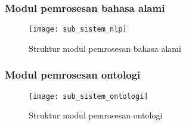 \subsubsection{Modul pemrosesan bahasa alami}

\begin{figure}[tb]
    \centering
    \texttt{[image: sub\_sistem\_nlp]}
    \caption{Struktur modul pemrosesan bahasa alami} 
    \label{fig:sub_sistem_nlp}
\end{figure}

\subsubsection{Modul pemrosesan ontologi}

\begin{figure}[tb]
    \centering
    \texttt{[image: sub\_sistem\_ontologi]}
    \caption{Struktur modul pemrosesan ontologi} 
    \label{fig:sub_sistem_ontologi}
\end{figure}




